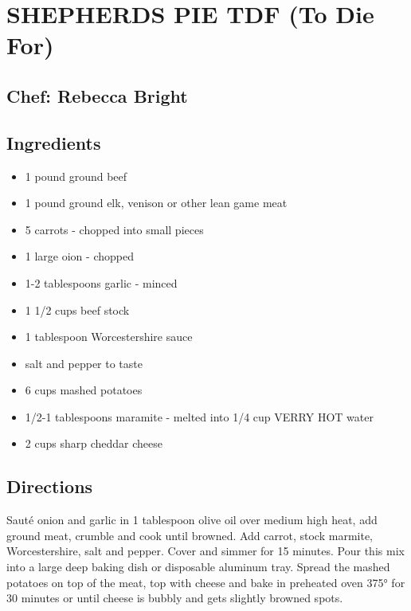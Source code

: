\documentclass[
]{book}
\providecommand{\tightlist}{%
  \setlength{\itemsep}{0pt}\setlength{\parskip}{0pt}}
\begin{document}
\hypertarget{shepherds-pie-tdf-to-die-for}{%
\section*{SHEPHERDS PIE TDF (To Die For)}\label{shepherds-pie-tdf-to-die-for}}


\hypertarget{chef-rebecca-bright-3}{%
\subsection*{Chef: Rebecca Bright}\label{chef-rebecca-bright-3}}


\hypertarget{ingredients-68}{%
\subsection*{Ingredients}\label{ingredients-68}}


\begin{itemize}
\tightlist
\item
  1 pound ground beef
\item
  1 pound ground elk, venison or other lean game meat
\item
  5 carrots - chopped into small pieces
\item
  1 large oion - chopped
\item
  1-2 tablespoons garlic - minced
\item
  1 1/2 cups beef stock
\item
  1 tablespoon Worcestershire sauce
\item
  salt and pepper to taste
\item
  6 cups mashed potatoes
\item
  1/2-1 tablespoons maramite - melted into 1/4 cup VERRY HOT water
\item
  2 cups sharp cheddar cheese
\end{itemize}

\hypertarget{directions-68}{%
\subsection*{Directions}\label{directions-68}}


Sauté onion and garlic in 1 tablespoon olive oil over medium high heat, add ground meat,
crumble and cook until browned. Add carrot, stock marmite, Worcestershire, salt and pepper.
Cover and simmer for 15 minutes. Pour this mix into a large deep baking dish or disposable aluminum tray.
Spread the mashed potatoes on top of the meat, top with cheese and bake in preheated oven 375°
for 30 minutes or until cheese is bubbly and gets slightly browned spots.
\end{document}
